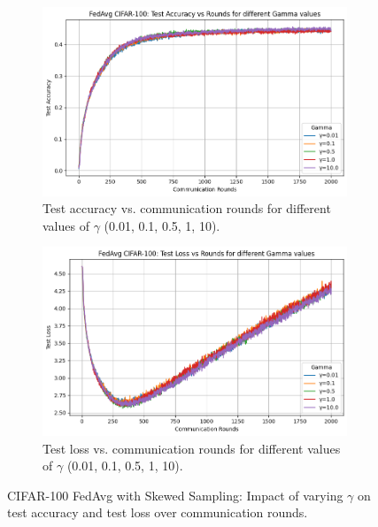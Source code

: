 \documentclass[10pt,twocolumn,letterpaper]{article}
\begin{document}
\begin{figure}[H]
    \centering
    \begin{subfigure}{0.48\linewidth}
        \centering
        \includegraphics[width=\textwidth]{figs/gamma_values_test_acc.png}
        \caption{Test accuracy vs. communication rounds for different values of $\gamma$ (0.01, 0.1, 0.5, 1, 10).}
        \label{fig:cifarGammaTestAcc}
    \end{subfigure}
    \hfill
    \begin{subfigure}{0.48\linewidth}
        \centering
        \includegraphics[width=\textwidth]{figs/gamma_values_test_loss.png}
        \caption{Test loss vs. communication rounds for different values of $\gamma$ (0.01, 0.1, 0.5, 1, 10).}
        \label{fig:cifarGammaTestLoss}
    \end{subfigure}
    \caption{CIFAR-100 FedAvg with Skewed Sampling: Impact of varying $\gamma$ on test accuracy and test loss over communication rounds.}
    \label{fig:cifarGamma}
\end{figure}
\end{document}
